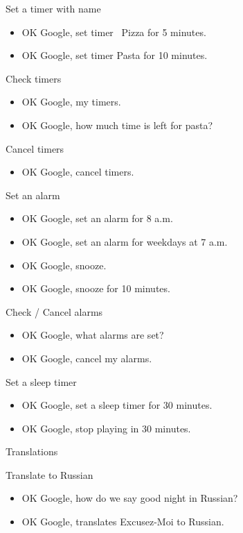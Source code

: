 \documentclass[
  a4paper,
]{article}
\providecommand{\tightlist}{%
  \setlength{\itemsep}{0pt}\setlength{\parskip}{0pt}}\usepackage{longtable,booktabs,array}
\begin{document}
Set a timer with name

\begin{itemize}
\item
  OK Google, set timer~ Pizza for 5 minutes.
\item
  OK Google, set timer Pasta for 10 minutes.
\end{itemize}

Check timers

\begin{itemize}
\item
  OK Google, my timers.
\item
  OK Google, how much time is left for pasta?
\end{itemize}

Cancel timers

\begin{itemize}
\tightlist
\item
  OK Google, cancel timers.
\end{itemize}

Set an alarm

\begin{itemize}
\item
  OK Google, set an alarm for 8 a.m.
\item
  OK Google, set an alarm for weekdays at 7 a.m.
\item
  OK Google, snooze.
\item
  OK Google, snooze for 10 minutes.
\end{itemize}

Check / Cancel alarms

\begin{itemize}
\item
  OK Google, what alarms are set?
\item
  OK Google, cancel my alarms.
\end{itemize}

Set a sleep timer

\begin{itemize}
\item
  OK Google, set a sleep timer for 30 minutes.
\item
  OK Google, stop playing in 30 minutes.
\end{itemize}

Translations

Translate to Russian

\begin{itemize}
\item
  OK Google, how do we say good night in Russian?
\item
  OK Google, translates Excusez-Moi to Russian.
\end{itemize}
\end{document}

